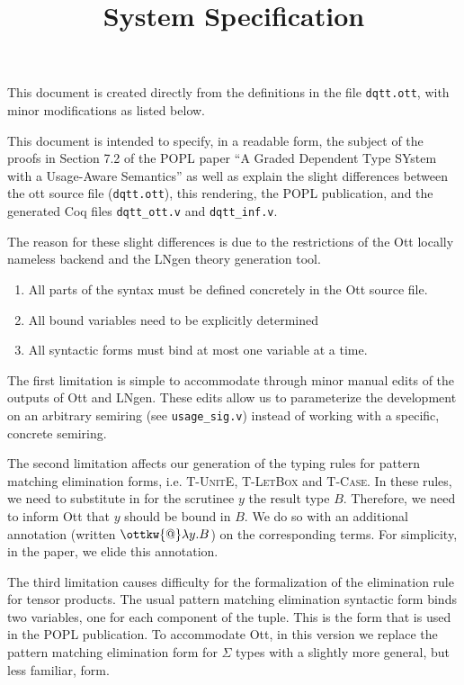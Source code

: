 \documentclass{article}
\title{System Specification}
\begin{document}
\maketitle

This document is created directly from the definitions in the file
{\texttt{dqtt.ott}}, with minor modifications as listed below.

This document is intended to specify, in a readable form, the subject of the
proofs in Section 7.2 of the POPL paper ``A Graded Dependent Type SYstem with
a Usage-Aware Semantics'' as well as explain the slight differences between
the ott source file ({\texttt{dqtt.ott}}), this rendering, the POPL publication, and the
generated Coq files \texttt{dqtt\_ott.v} and \texttt{dqtt\_inf.v}.

The reason for these slight differences is due to the restrictions of the Ott
locally nameless backend and the LNgen theory generation tool. 
\begin{enumerate}
\item All parts of the syntax must be defined concretely in the Ott source file. 
\item All bound variables need to be explicitly determined
\item All syntactic forms must bind at most one variable at a time.
\end{enumerate}

The first limitation is simple to accommodate through minor manual edits of
the outputs of Ott and LNgen. These edits allow us to parameterize the
development on an arbitrary semiring (see \texttt{usage\_sig.v}) instead of
working with a specific, concrete semiring. 

The second limitation affects our generation of the typing rules for pattern
matching elimination forms, i.e. \textsc{T-UnitE}, \textsc{T-LetBox} and
\textsc{T-Case}. In these rules, we need to substitute in for the scrutinee
$y$ the result type $B$. Therefore, we need to inform Ott that $y$ should be
bound in $B$. We do so with an additional annotation (written
$\ottkw{@} \lambda y. B$) on the corresponding terms. For simplicity, in the
paper, we elide this annotation.

The third limitation causes difficulty for the formalization of the
elimination rule for tensor products. The usual pattern matching elimination
syntactic form binds two variables, one for each component of the tuple. This
is the form that is used in the POPL publication. To accommodate Ott, in this
version we replace the pattern matching elimination form for $\Sigma$ types
with a slightly more general, but less familiar, form.
\end{document}
